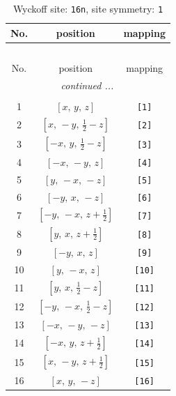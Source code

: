 \documentclass[fleqn,8pt]{jsarticle}
\begin{document}
\begin{longtable}{ccc}
\caption{Wyckoff site: {\tt 16n}, site symmetry: {\tt 1}}
 \\
 \hline \hline
No. & position & mapping \\ \hline \endfirsthead

\multicolumn{2}{l}{\tablename\ \thetable{}} \\
 \hline \hline
No. & position & mapping \\ \hline \endhead

 \hline \hline
\multicolumn{2}{r}{\footnotesize\it continued ...} \\ \endfoot

 \hline \hline
\multicolumn{2}{r}{} \\ \endlastfoot

1 & $\left[ x,\, y,\, z \right]$ & {\tt [1]} \\ \hline
2 & $\left[ x,\, - y,\, \frac{1}{2} - z \right]$ & {\tt [2]} \\ \hline
3 & $\left[ - x,\, y,\, \frac{1}{2} - z \right]$ & {\tt [3]} \\ \hline
4 & $\left[ - x,\, - y,\, z \right]$ & {\tt [4]} \\ \hline
5 & $\left[ y,\, - x,\, - z \right]$ & {\tt [5]} \\ \hline
6 & $\left[ - y,\, x,\, - z \right]$ & {\tt [6]} \\ \hline
7 & $\left[ - y,\, - x,\, z + \frac{1}{2} \right]$ & {\tt [7]} \\ \hline
8 & $\left[ y,\, x,\, z + \frac{1}{2} \right]$ & {\tt [8]} \\ \hline
9 & $\left[ - y,\, x,\, z \right]$ & {\tt [9]} \\ \hline
10 & $\left[ y,\, - x,\, z \right]$ & {\tt [10]} \\ \hline
11 & $\left[ y,\, x,\, \frac{1}{2} - z \right]$ & {\tt [11]} \\ \hline
12 & $\left[ - y,\, - x,\, \frac{1}{2} - z \right]$ & {\tt [12]} \\ \hline
13 & $\left[ - x,\, - y,\, - z \right]$ & {\tt [13]} \\ \hline
14 & $\left[ - x,\, y,\, z + \frac{1}{2} \right]$ & {\tt [14]} \\ \hline
15 & $\left[ x,\, - y,\, z + \frac{1}{2} \right]$ & {\tt [15]} \\ \hline
16 & $\left[ x,\, y,\, - z \right]$ & {\tt [16]} \\
\end{longtable}
\end{document}
